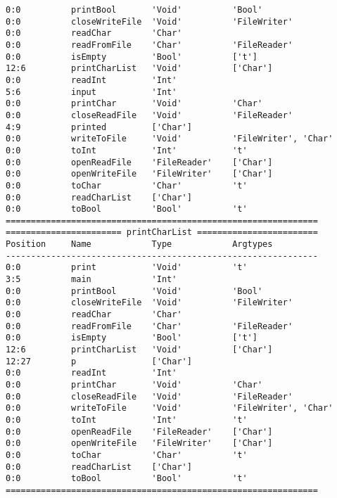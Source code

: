 \documentclass[a4paper]{article}
\begin{document}
\begin{verbatim}
0:0          printBool       'Void'          'Bool'              
0:0          closeWriteFile  'Void'          'FileWriter'        
0:0          readChar        'Char'                              
0:0          readFromFile    'Char'          'FileReader'        
0:0          isEmpty         'Bool'          ['t']               
12:6         printCharList   'Void'          ['Char']            
0:0          readInt         'Int'                               
5:6          input           'Int'                               
0:0          printChar       'Void'          'Char'              
0:0          closeReadFile   'Void'          'FileReader'        
4:9          printed         ['Char']                            
0:0          writeToFile     'Void'          'FileWriter', 'Char'
0:0          toInt           'Int'           't'                 
0:0          openReadFile    'FileReader'    ['Char']            
0:0          openWriteFile   'FileWriter'    ['Char']            
0:0          toChar          'Char'          't'                 
0:0          readCharList    ['Char']                            
0:0          toBool          'Bool'          't'                 
==============================================================
======================= printCharList ========================
Position     Name            Type            Argtypes            
--------------------------------------------------------------
0:0          print           'Void'          't'                 
3:5          main            'Int'                               
0:0          printBool       'Void'          'Bool'              
0:0          closeWriteFile  'Void'          'FileWriter'        
0:0          readChar        'Char'                              
0:0          readFromFile    'Char'          'FileReader'        
0:0          isEmpty         'Bool'          ['t']               
12:6         printCharList   'Void'          ['Char']            
12:27        p               ['Char']                            
0:0          readInt         'Int'                               
0:0          printChar       'Void'          'Char'              
0:0          closeReadFile   'Void'          'FileReader'        
0:0          writeToFile     'Void'          'FileWriter', 'Char'
0:0          toInt           'Int'           't'                 
0:0          openReadFile    'FileReader'    ['Char']            
0:0          openWriteFile   'FileWriter'    ['Char']            
0:0          toChar          'Char'          't'                 
0:0          readCharList    ['Char']                            
0:0          toBool          'Bool'          't'                 
==============================================================
\end{verbatim}
\end{document}
